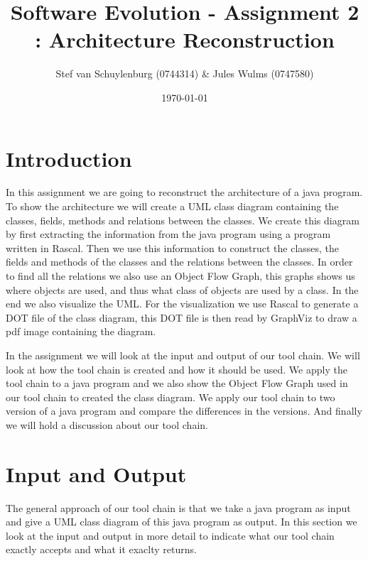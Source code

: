 \documentclass[a4paper,11pt]{article}
\title{Software Evolution - Assignment 2 : Architecture Reconstruction}
\author{Stef van Schuylenburg (0744314) \& Jules Wulms (0747580)}
\date{\today}
\begin{document}
	\maketitle

	\section{Introduction}
		In this assignment we are going to reconstruct the architecture of a java program.
		To show the architecture we will create a UML class diagram containing the classes, fields, methods and relations between the classes.
		We create this diagram by first extracting the information from the java program using a program written in Rascal\cite{rascal}.
		Then we use this information to construct the classes, the fields and methods of the classes and the relations between the classes.
		In order to find all the relations we also use an Object Flow Graph, this graphs shows us where objects are used, and thus what class of objects are used by a class. %
		In the end we also visualize the UML. For the visualization we use Rascal to generate a DOT file of the class diagram, this DOT file is then read by GraphViz\cite{graphviz} to draw a pdf image containing the diagram.
		
		In the assignment we will look at the input and output of our tool chain. 
		We will look at how the tool chain is created and how it should be used.
		We apply the tool chain to a java program and we also show the Object Flow Graph used in our tool chain to created the class diagram.
		We apply our tool chain to two version of a java program and compare the differences in the versions.
		And finally we will hold a discussion about our tool chain.
	
	\section{Input and Output}
		The general approach of our tool chain is that we take a java program as input and give a UML class diagram of this java program as output.
		In this section we look at the input and output in more detail to indicate what our tool chain exactly accepts and what it exaclty returns.
		
\end{document}
